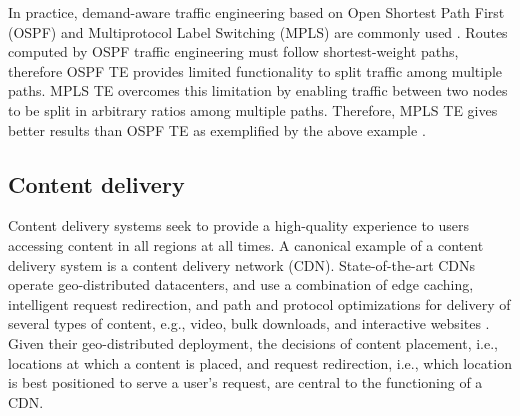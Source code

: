 In practice, demand-aware traffic engineering based on Open Shortest Path First (OSPF) and Multiprotocol Label Switching (MPLS) are commonly used  \cite{COPE,MultiTM,fortz2000internet,MPLS2}. Routes computed by OSPF traffic engineering must follow shortest-weight paths, therefore OSPF TE provides limited functionality to split traffic among multiple paths. MPLS TE overcomes this limitation by enabling traffic between two nodes to be split  in arbitrary ratios among multiple paths. Therefore, MPLS TE gives better results than OSPF TE as exemplified by the above example \cite{COPE,MultiTM}.



%
%
%


\subsection{Content delivery}
\label{sec:ch2-cdn}

Content delivery systems seek to provide a high-quality experience to users accessing content in all regions  at all times. A canonical example of a content delivery system is a content delivery network (CDN). State-of-the-art CDNs operate geo-distributed datacenters, and use a combination of edge caching, intelligent request redirection, and path and protocol optimizations for delivery of several types of content, e.g., video, bulk downloads, and interactive websites \cite{DilleyMPPSW02,akamai-overview}. Given their geo-distributed deployment, the decisions of content placement, i.e., locations at which a content is placed, and request redirection, i.e., which location is best positioned to serve a user's request, are central to the functioning of a CDN.

